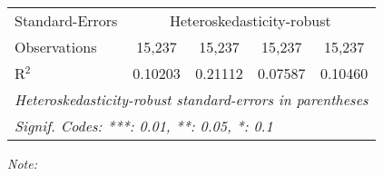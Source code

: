 \begin{table}[htbp!]
\begin{adjustbox}{width = 1\textwidth, max height = 0.95\textheight, center}
\begin{threeparttable}[b]
\begin{tabular}{lcccc}
            \midrule 
            Standard-Errors & \multicolumn{4}{c}{Heteroskedasticity-robust} \\ 
            Observations         & 15,237                         & 15,237                         & 15,237                          & 15,237\\  
            R$^2$                & 0.10203                        & 0.21112                        & 0.07587                         & 0.10460\\  
            \midrule \midrule
            \multicolumn{5}{l}{\emph{Heteroskedasticity-robust standard-errors in parentheses}}\\
            \multicolumn{5}{l}{\emph{Signif. Codes: ***: 0.01, **: 0.05, *: 0.1}}\\
         \end{tabular}
         
         \begin{tablenotes}\item \medskip \textit{Note:}
         \end{tablenotes}
      \end{threeparttable}
   \end{adjustbox}
\end{table}


